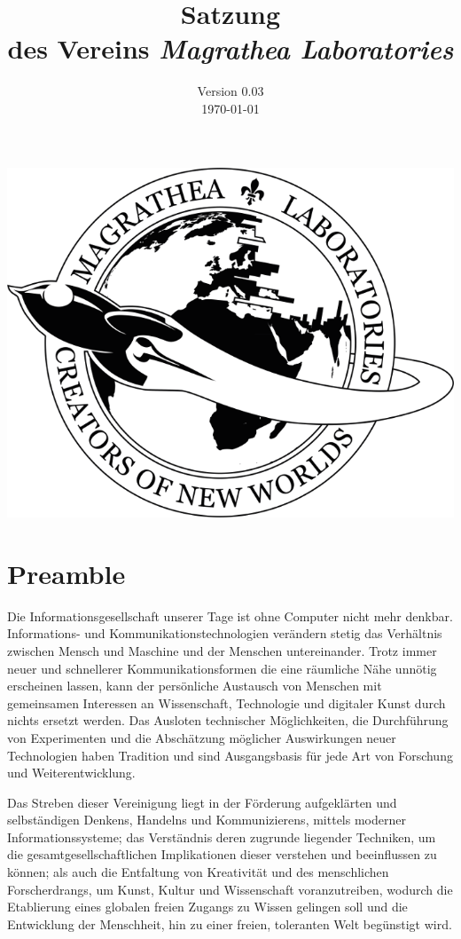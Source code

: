 \documentclass[ngerman]{article}
\title{Satzung\\
des Vereins \emph{Magrathea Laboratories}}
\date{Version 0.03\\
\today}
\begin{document}
\maketitle

\begin{center}
\emph{\includegraphics[scale=0.3]{logo}}
\par\end{center}

\thispagestyle{empty}
\pagebreak

\section{Preamble}
Die Informationsgesellschaft unserer Tage ist ohne Computer nicht mehr denkbar. Informations- und Kommunikationstechnologien verändern stetig das Verhältnis zwischen Mensch und Maschine und der Menschen untereinander. Trotz immer neuer und schnellerer Kommunikationsformen die eine  räumliche Nähe unnötig erscheinen lassen, kann der persönliche Austausch von Menschen mit gemeinsamen Interessen an Wissenschaft, Technologie und digitaler Kunst durch nichts ersetzt werden. Das Ausloten technischer Möglichkeiten, die Durchführung von Experimenten und die Abschätzung möglicher Auswirkungen neuer Technologien haben Tradition und sind Ausgangsbasis für jede Art von Forschung und Weiterentwicklung.

Das Streben dieser Vereinigung liegt in der Förderung aufgeklärten und selbständigen Denkens, Handelns und Kommunizierens, mittels moderner Informationssysteme; das Verständnis deren zugrunde liegender Techniken, um die gesamtgesellschaftlichen Implikationen dieser verstehen und beeinflussen zu können; als auch die Entfaltung von Kreativität und des menschlichen Forscherdrangs, um Kunst, Kultur und Wissenschaft voranzutreiben, wodurch die Etablierung eines globalen freien Zugangs zu Wissen gelingen soll und die Entwicklung der Menschheit, hin zu einer freien, toleranten Welt begünstigt wird.
\end{document}
